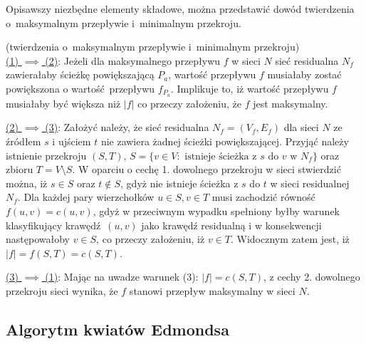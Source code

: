 \par{
  Opisawszy niezbędne elementy składowe, można przedstawić dowód twierdzenia o~maksymalnym przepływie i~minimalnym przekroju.

  \begin{bproof}{(twierdzenia o~maksymalnym przepływie i~minimalnym przekroju)\\}
    \underline{(1) $\implies$ (2)}: Jeżeli dla maksymalnego przepływu $f$ w sieci $N$ sieć residualna $N_f$ zawierałaby ścieżkę powiększającą $P_a$, wartość przepływu $f$ musiałaby zostać powiększona o wartość przepływu $f_{P_a}$.
    Implikuje to, iż wartość przepływu $f$ musiałaby być większa niż $|f|$ co przeczy założeniu, że $f$ jest maksymalny.

    \underline{(2) $\implies$ (3)}: Założyć należy, że sieć residualna $N_f=(V_f, E_f)$ dla sieci $N$ ze źródłem $s$ i ujściem $t$ nie zawiera żadnej ścieżki powiększającej.
    Przyjąć należy istnienie przekroju $(S, T)$, $S=\{v \in V:\text{ istnieje ścieżka z }s\text{ do }v\text{ w }N_f\}$ oraz zbioru $T=V\setminus S$.
    W oparciu o cechę 1. dowolnego przekroju w sieci stwierdzić można, iż $s \in S$ oraz $t \notin S$, gdyż nie istnieje ścieżka z $s$ do $t$ w sieci residualnej $N_f$.
    Dla każdej pary wierzchołków $u \in S, v \in T$ musi zachodzić równość $f(u, v)=c(u, v)$, gdyż w przeciwnym wypadku spełniony byłby warunek klasyfikujący krawędź $(u,v)$ jako krawędź residualną i w konsekwencji następowałoby $v \in S$, co przeczy założeniu, iż $v \in T$.
    Widocznym zatem jest, iż $|f|=f(S, T)=c(S, T)$.

    \underline{(3) $\implies$ (1)}: Mając na uwadze warunek (3): $|f|=c(S,T)$, z cechy 2. dowolnego przekroju sieci wynika, że $f$ stanowi przepływ maksymalny w sieci $N$.
  \end{bproof}
}
\subsection{Algorytm kwiatów Edmondsa}\label{ss_edmonds}




